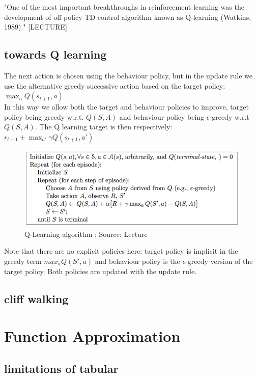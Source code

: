 "One of the most important breakthroughs in reinforcement learning was the development of off-policy TD control algorithm known as Q-learning (Watkins, 1989)." [LECTURE]

\subsection{towards Q learning}
The  next action is chosen using the behaviour policy, but in the update rule we use the alternative greedy successive action based on the target policy: $\max_a Q(s_{t+1}, a)$\\

In this way we allow both the target and behaviour policies to improve, target policy being greedy w.r.t. $Q(S, A)$ and behaviour policy being $\epsilon$-greedy w.r.t $Q(S, A)$. The Q learning target is then respectively: $r_{t+1} + \max_{a'} \gamma Q(s_{t+1}, a')$\\

\begin{figure}[h!]
  \centering
  \includegraphics[scale=0.5]{figures/q_learning.PNG}
  \caption{Q-Learning algorithm
; Source: Lecture}
  \label{fig:q_learning}
\end{figure}

Note that there are no explicit policies here: target policy is implicit in the greedy term $max_a Q(S', a)$ and behaviour policy is the $\epsilon$-greedy version of the target policy. Both policies are updated with the update rule.

\subsection{cliff walking}

\section{Function Approximation}

\subsection{limitations of tabular}

